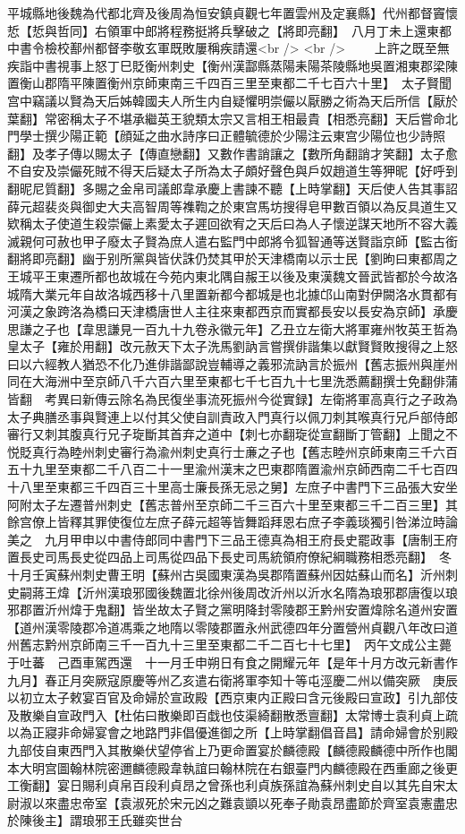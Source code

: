 平城縣地後魏為代都北齊及後周為恒安鎮貞觀七年置雲州及定襄縣】代州都督竇懷悊【悊與哲同】右領軍中郎將程務挺將兵擊破之【將即亮翻】　八月丁未上還東都中書令檢校鄯州都督李敬玄軍既敗屢稱疾請還<br />
<br />
　　上許之既至無疾詣中書視事上怒丁巳貶衡州刺史【衡州漢酃縣蒸陽耒陽茶陵縣地吳置湘東郡梁陳置衡山郡隋平陳置衡州京師東南三千四百三里至東都二千七百六十里】　太子賢聞宫中竊議以賢為天后姊韓國夫人所生内自疑懼明崇儼以厭勝之術為天后所信【厭於葉翻】常密稱太子不堪承繼英王貌類太宗又言相王相最貴【相悉亮翻】天后嘗命北門學士撰少陽正範【顔延之曲水詩序曰正體毓德於少陽注云東宫少陽位也少詩照翻】及孝子傳以賜太子【傳直戀翻】又數作書誚讓之【數所角翻誚才笑翻】太子愈不自安及崇儼死賊不得天后疑太子所為太子頗好聲色與戶奴趙道生等狎昵【好呼到翻昵尼質翻】多賜之金帛司議郎韋承慶上書諫不聽【上時掌翻】天后使人告其事詔薛元超裴炎與御史大夫高智周等襍鞫之於東宫馬坊搜得皂甲數百領以為反具道生又欵稱太子使道生殺崇儼上素愛太子遲回欲宥之天后曰為人子懷逆謀天地所不容大義滅親何可赦也甲子廢太子賢為庶人遣右監門中郎將令狐智通等送賢詣京師【監古銜翻將即亮翻】幽于别所黨與皆伏誅仍焚其甲於天津橋南以示士民【劉昫曰東都周之王城平王東遷所都也故城在今苑内東北隅自赧王以後及東漢魏文晉武皆都於今故洛城隋大業元年自故洛城西移十八里置新都今都城是也北據邙山南對伊闕洛水貫都有河漢之象跨洛為橋曰天津橋唐世人主往來東都西京而實都長安以長安為京師】承慶思謙之子也【韋思謙見一百九十九卷永徽元年】乙丑立左衛大將軍雍州牧英王哲為皇太子【雍於用翻】改元赦天下太子洗馬劉訥言嘗撰俳諧集以獻賢賢敗搜得之上怒曰以六經教人猶恐不化乃進俳諧鄙說豈輔導之義邪流訥言於振州【舊志振州與崖州同在大海洲中至京師八千六百六里至東都七千七百九十七里洗悉薦翻撰士免翻俳蒲皆翻　考異曰新傳云除名為民復坐事流死振州今從實録】左衛將軍高真行之子政為太子典膳丞事與賢連上以付其父使自訓責政入門真行以佩刀刺其喉真行兄戶部侍郎審行又刺其腹真行兄子琁斷其首弃之道中【刺七亦翻琁從宣翻斷丁管翻】上聞之不悦貶真行為睦州刺史審行為渝州刺史真行士亷之子也【舊志睦州京師東南三千六百五十九里至東都二千八百二十一里渝州漢末之巴東郡隋置渝州京師西南二千七百四十八里至東都三千四百三十里高士廉長孫无忌之舅】左庶子中書門下三品張大安坐阿附太子左遷普州刺史【舊志普州至京師二千三百六十里至東都三千二百三里】其餘宫僚上皆釋其罪使復位左庶子薛元超等皆舞蹈拜恩右庶子李義琰獨引咎涕泣時論美之　九月甲申以中書侍郎同中書門下三品王德真為相王府長史罷政事【唐制王府置長史司馬長史從四品上司馬從四品下長史司馬統領府僚紀綱職務相悉亮翻】　冬十月壬寅蘇州刺史曹王明【蘇州古吳國東漢為吳郡隋置蘇州因姑蘇山而名】沂州刺史嗣蔣王煒【沂州漢琅邪國後魏置北徐州後周改沂州以沂水名隋為琅邪郡唐復以琅邪郡置沂州煒于鬼翻】皆坐故太子賢之黨明降封零陵郡王黔州安置煒除名道州安置【道州漢零陵郡冷道馮乘之地隋以零陵郡置永州武德四年分置營州貞觀八年改曰道州舊志黔州京師南三千一百九十三里至東都二千二百七十七里】　丙午文成公主薨于吐蕃　己酉車駕西還　十一月壬申朔日有食之開耀元年【是年十月方改元新書作九月】春正月突厥寇原慶等州乙亥遣右衛將軍李知十等屯涇慶二州以備突厥　庚辰以初立太子敕宴百官及命婦於宣政殿【西京東内正殿曰含元後殿曰宣政】引九部伎及散樂自宣政門入【杜佑曰散樂即百戱也伎渠綺翻散悉亶翻】太常博士袁利貞上疏以為正寢非命婦宴會之地路門非倡優進御之所【上時掌翻倡音昌】請命婦會於别殿九部伎自東西門入其散樂伏望停省上乃更命置宴於麟德殿【麟德殿麟德中所作也閣本大明宫圖翰林院密邇麟德殿韋執誼曰翰林院在右銀臺門内麟德殿在西重廊之後更工衡翻】宴日賜利貞帛百段利貞昂之曾孫也利貞族孫誼為蘇州刺史自以其先自宋太尉淑以來盡忠帝室【袁淑死於宋元凶之難袁顗以死奉子勛袁昂盡節於齊室袁憲盡忠於陳後主】謂琅邪王氏雖奕世台